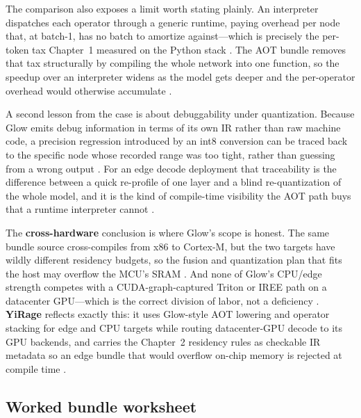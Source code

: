 The comparison also exposes a limit worth stating plainly. An interpreter dispatches each operator through a generic runtime, paying overhead per node that, at batch-1, has no batch to amortize against---which is precisely the per-token tax Chapter~1 measured on the Python stack \citep{taxbreak2026,kwon2023vllm}. The AOT bundle removes that tax structurally by compiling the whole network into one function, so the speedup over an interpreter widens as the model gets deeper and the per-operator overhead would otherwise accumulate \citep{rotem2018glow,memoryfloor2026}.

A second lesson from the case is about debuggability under quantization. Because Glow emits debug information in terms of its own IR rather than raw machine code, a precision regression introduced by an int8 conversion can be traced back to the specific node whose recorded range was too tight, rather than guessing from a wrong output \citep{rotem2018glow}. For an edge decode deployment that traceability is the difference between a quick re-profile of one layer and a blind re-quantization of the whole model, and it is the kind of compile-time visibility the AOT path buys that a runtime interpreter cannot \citep{pytorchglow2024,patel2025llminference}.

The \textbf{cross-hardware} conclusion is where Glow's scope is honest. The same bundle source cross-compiles from x86 to Cortex-M, but the two targets have wildly different residency budgets, so the fusion and quantization plan that fits the host may overflow the MCU's SRAM \citep{rotem2018glow,amd2024aie}. And none of Glow's CPU/edge strength competes with a CUDA-graph-captured Triton or IREE path on a datacenter GPU---which is the correct division of labor, not a deficiency \citep{nvidia2024cudagraphs,semianalysis2024tma}. \textbf{YiRage} reflects exactly this: it uses Glow-style AOT lowering and operator stacking for edge and CPU targets while routing datacenter-GPU decode to its GPU backends, and carries the Chapter~2 residency rules as checkable IR metadata so an edge bundle that would overflow on-chip memory is rejected at compile time \citep{yirage2026}.

\subsection{Worked bundle worksheet}

